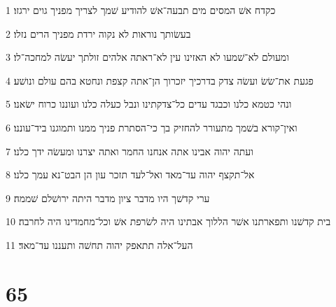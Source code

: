 \par 1 כקדח אשׁ המסים מים תבעה־אשׁ להודיע שׁמך לצריך מפניך גוים ירגזו׃
\par 2 בעשׂותך נוראות לא נקוה ירדת מפניך הרים נזלו׃
\par 3 ומעולם לא־שׁמעו לא האזינו עין לא־ראתה אלהים זולתך יעשׂה למחכה־לו׃
\par 4 פגעת את־שׂשׂ ועשׂה צדק בדרכיך יזכרוך הן־אתה קצפת ונחטא בהם עולם ונושׁע׃
\par 5 ונהי כטמא כלנו וכבגד עדים כל־צדקתינו ונבל כעלה כלנו ועוננו כרוח ישׂאנו׃
\par 6 ואין־קורא בשׁמך מתעורר להחזיק בך כי־הסתרת פניך ממנו ותמוגנו ביד־עוננו׃
\par 7 ועתה יהוה אבינו אתה אנחנו החמר ואתה יצרנו ומעשׂה ידך כלנו׃
\par 8 אל־תקצף יהוה עד־מאד ואל־לעד תזכר עון הן הבט־נא עמך כלנו׃
\par 9 ערי קדשׁך היו מדבר ציון מדבר היתה ירושׁלם שׁממה׃
\par 10 בית קדשׁנו ותפארתנו אשׁר הללוך אבתינו היה לשׂרפת אשׁ וכל־מחמדינו היה לחרבה׃
\par 11 העל־אלה תתאפק יהוה תחשׁה ותעננו עד־מאד׃

\chapter{65}

